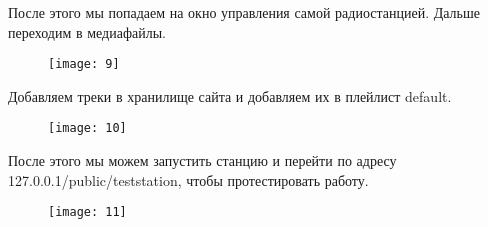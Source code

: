 После этого мы попадаем на окно управления самой радиостанцией. Дальше переходим в медиафайлы.
\begin{figure}[H]
  \centering
  \texttt{[image: 9]}
  \caption{}
  \label{fig:9}
\end{figure}

Добавляем треки в хранилище сайта и добавляем их в плейлист default.
\begin{figure}[H]
  \centering
  \texttt{[image: 10]}
  \caption{}
  \label{fig:10}
\end{figure}

После этого мы можем запустить станцию и перейти по адресу 127.0.0.1/public/teststation, чтобы протестировать работу.
\begin{figure}[H]
  \centering
  \texttt{[image: 11]}
  \caption{}
  \label{fig:11}
\end{figure}